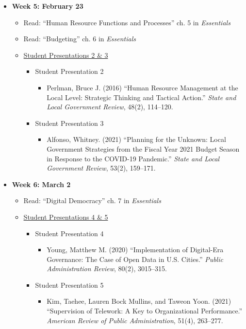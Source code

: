 \documentclass[11pt]{article}
\begin{document}
\begin{itemize}
	\item[] \textbf{Week 5: February 23} 
	\begin{itemize}
		\item Read: ``Human Resource Functions and Processes'' ch. 5 in \emph{Essentials} 
		\item Read: ``Budgeting'' ch. 6 in \emph{Essentials}
		\item \underline{Student Presentations 2 \& 3}
			\begin{itemize}
				\item Student Presentation 2
					\begin{itemize}
						\item Perlman, Bruce J. (2016) ``Human Resource Management at the Local Level: Strategic Thinking and Tactical Action.'' \emph{State and Local Government Review}, 48(2), 114--120.
					\end{itemize}
				\item Student Presentation 3
					\begin{itemize}
						\item Alfonso, Whitney. (2021) ``Planning for the Unknown: Local Government Strategies from the Fiscal Year 2021 Budget Season in Response to the COVID-19 Pandemic.'' \emph{State and Local Government Review}, 53(2), 159--171.
					\end{itemize}
			\end{itemize}
	\end{itemize}

	\item[] \textbf{Week 6: March 2} 
	\begin{itemize}
		\item Read: ``Digital Democracy'' ch. 7 in \emph{Essentials}
		\item \underline{Student Presentations 4 \& 5}
			\begin{itemize}
				\item Student Presentation 4
					\begin{itemize}
						\item Young, Matthew M. (2020) ``Implementation of Digital-Era Governance: The Case of Open Data in U.S. Cities.'' \emph{Public Administration Review}, 80(2), 3015--315.
					\end{itemize}
				\item Student Presentation 5
					\begin{itemize}
						\item Kim, Taehee, Lauren Bock Mullins, and Taweon Yoon. (2021) ``Supervision of Telework: A Key to Organizational Performance.'' \emph{American Review of Public Administration}, 51(4), 263--277.
					\end{itemize}
			\end{itemize}	
	\end{itemize}
		

\end{itemize}
\end{document}
